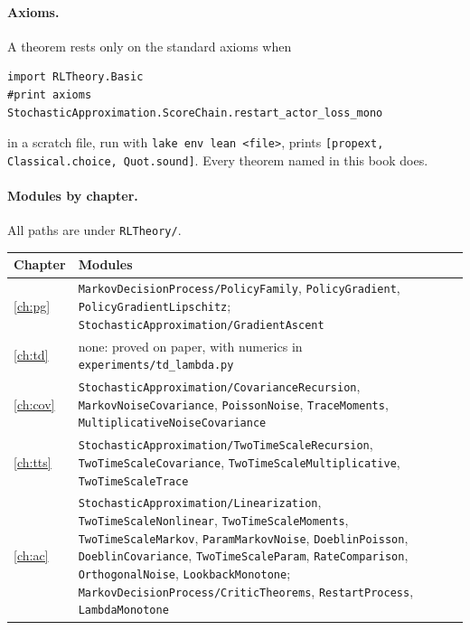 \documentclass[11pt,oneside]{book}
\theoremstyle{definition}
\theoremstyle{remark}
\numberwithin{equation}{chapter}
\begin{document}
\paragraph{Axioms.} A theorem rests only on the standard axioms when
\begin{verbatim}
import RLTheory.Basic
#print axioms StochasticApproximation.ScoreChain.restart_actor_loss_mono
\end{verbatim}
in a scratch file, run with \texttt{lake env lean <file>}, prints
\texttt{[propext, Classical.choice, Quot.sound]}. Every theorem named in this book does.

\paragraph{Modules by chapter.} All paths are under \texttt{RLTheory/}.

\medskip
\begin{tabular}{@{}lp{}@{}}
\toprule
Chapter & Modules \\
\midrule
\ref{ch:pg} & \texttt{MarkovDecisionProcess/PolicyFamily}, \texttt{PolicyGradient},
  \texttt{PolicyGradientLipschitz}; \texttt{StochasticApproximation/GradientAscent} \\
\ref{ch:td} & none: proved on paper, with numerics in \texttt{experiments/td\_lambda.py} \\
\ref{ch:cov} & \texttt{StochasticApproximation/CovarianceRecursion}, \texttt{MarkovNoiseCovariance},
  \texttt{PoissonNoise}, \texttt{TraceMoments}, \texttt{MultiplicativeNoiseCovariance} \\
\ref{ch:tts} & \texttt{StochasticApproximation/TwoTimeScaleRecursion}, \texttt{TwoTimeScaleCovariance},
  \texttt{TwoTimeScaleMultiplicative}, \texttt{TwoTimeScaleTrace} \\
\ref{ch:ac} & \texttt{StochasticApproximation/Linearization}, \texttt{TwoTimeScaleNonlinear},
  \texttt{TwoTimeScaleMoments}, \texttt{TwoTimeScaleMarkov}, \texttt{ParamMarkovNoise},
  \texttt{DoeblinPoisson}, \texttt{DoeblinCovariance}, \texttt{TwoTimeScaleParam},
  \texttt{RateComparison}, \texttt{OrthogonalNoise}, \texttt{LookbackMonotone};
  \texttt{MarkovDecisionProcess/CriticTheorems}, \texttt{RestartProcess}, \texttt{LambdaMonotone} \\
\bottomrule
\end{tabular}

\backmatter

\end{document}
